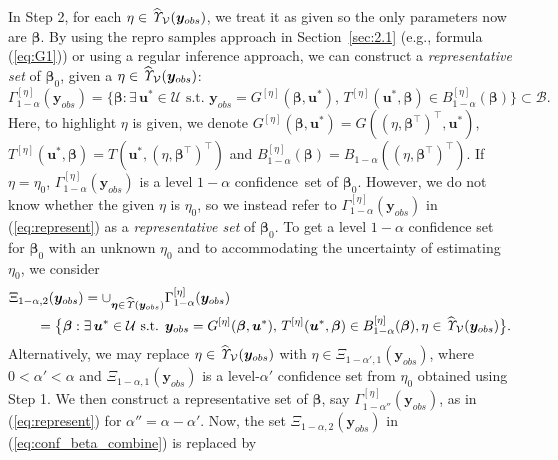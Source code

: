 \documentclass[12pt]{article}
\theoremstyle{shortspace}
\def\*#1{\bm{#1}}
\begin{document}
In Step 2, for each $\eta \in \widehat{\it \Upsilon}_{\mathcal V}(\*y_{obs})$, we treat it as given so the only parameters now are $\*\beta$. By using the repro samples approach in Section~\ref{sec:2.1} (e.g., formula (\ref{eq:G1})) or using a regular inference approach, we can construct a {\it representative set} of $\*\beta_0$, given a $\eta \in \widehat{\it \Upsilon}_{\mathcal V}(\*y_{obs})$: 
\begin{equation}\label{eq:represent}
\Gamma_{1-\alpha}^{[\eta]}(\*y_{obs}) = \big\{\*\beta: \exists \, \*u^* \in {\mathcal U} \mbox{ s.t. }  \*y_{obs} = 
G^{[\eta]}(\*\beta, \*u^*),
\,  
T^{[\eta]}(\*u^*, \*\beta) \in B_{1 - \alpha}^{[\eta]}(\*\beta)\big\} \subset {\mathcal B}.
\end{equation}
Here, to highlight $\eta$ is given, we denote $G^{[\eta]}(\*\beta, \*u^*)=
G((\eta,\*\beta^\top)^\top, \*u^*)$, $T^{[\eta]}(\*u^*, \*\beta) = T(\*u^*, (\eta,\*\beta^\top)^\top)$ and $B_{1 - \alpha}^{[\eta]}(\*\beta) = B_{1 - \alpha}((\eta,\*\beta^\top)^\top)$. 
If $\eta = \eta_0$, 
$\Gamma_{1-\alpha}^{[\eta]}(\*y_{obs})$ is a level $1 - \alpha$ confidence~set of $\*\beta_0$. However, we do not know whether the given $\eta$ is $\eta_0$, 
so we instead refer to $\Gamma_{1-\alpha}^{[\eta]}(\*y_{obs})$ in (\ref{eq:represent}) as a {\it representative set} of $\*\beta_0$. 
To get a level $1 -\alpha$ confidence set for $\*\beta_0$ with an unknown $\eta_0$ and to accommodating the uncertainty of estimating $\eta_0$, we consider
\begin{align}  \label{eq:conf_beta_combine}
& \Xi_{1-\alpha, 2}(\*y_{obs})  =  \cup_{\*\eta \in \widehat{\it \Upsilon}(\*y_{obs})} \Gamma_{1-\alpha}^{[\eta]}(\*y_{obs}) \nonumber \\
& \qquad = \big\{\*\beta: \exists \, \*u^* \in {\mathcal U} \mbox{ s.t. }  \*y_{obs} = 
G^{[\eta]}(\*\beta, \*u^*),
\,  
T^{[\eta]}(\*u^*, \*\beta) \in B_{1 - \alpha}^{[\eta]}(\*\beta),  \eta \in \widehat{\it \Upsilon}_{\mathcal V}(\*y_{obs}) \big\}.
\end{align}
Alternatively,
we may replace $\eta \in \widehat{\it \Upsilon}_{\mathcal V}(\*y_{obs})$ with $\eta \in \Xi_{1-\alpha', 1}(\*y_{obs})$, where $0< \alpha' < \alpha$ and $\Xi_{1-\alpha, 1}(\*y_{obs})$ is a level-$\alpha'$ confidence set from $\eta_0$ obtained using Step 1. We then construct a representative set of $\*\beta$, say $\Gamma_{1-\alpha''}^{[\eta]}(\*y_{obs})$, as in (\ref{eq:represent}) for $\alpha'' =  \alpha - \alpha'$. 
Now, 
 the set $\Xi_{1-\alpha, 2}(\*y_{obs})$ in 
(\ref{eq:conf_beta_combine}) is replaced by 
\end{document}

